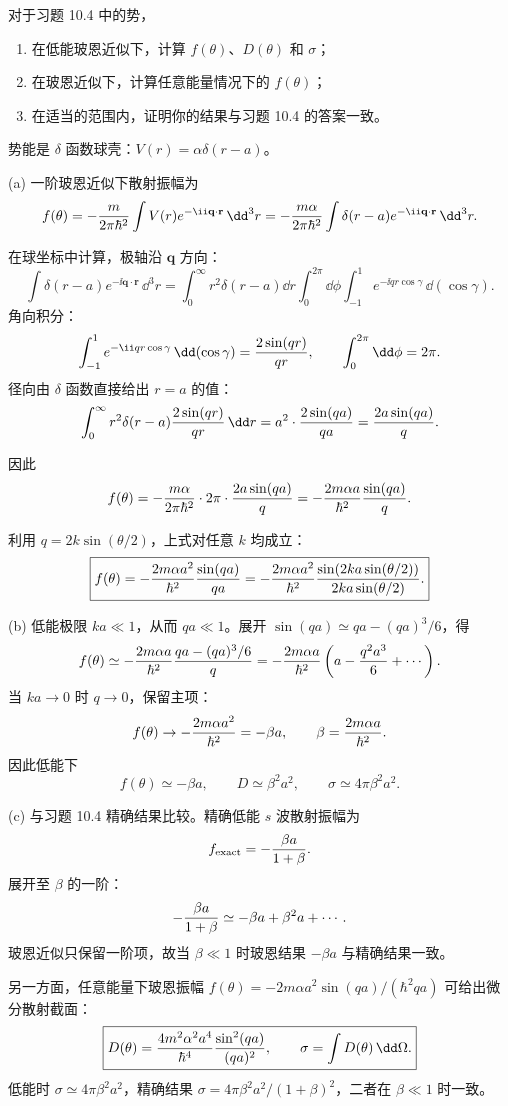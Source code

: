 \begin{question}
对于习题 10.4 中的势，
\begin{enumerate}
\item 在低能玻恩近似下，计算 $f(\theta)$、$D(\theta)$ 和 $\sigma$；
\item 在玻恩近似下，计算任意能量情况下的 $f(\theta)$；
\item 在适当的范围内，证明你的结果与习题 10.4 的答案一致。
\end{enumerate}
\end{question}
\begin{solution}
势能是 $\delta$ 函数球壳：$V(r)=\alpha\delta(r-a)$。

(a) 一阶玻恩近似下散射振幅为
\[
f(\theta)=-{m\over2\pi\hbar^2}\int V(r)e^{-\ii\mathbf q\cdot\mathbf r}\,\dd^3r
=-{m\alpha\over2\pi\hbar^2}\int \delta(r-a)e^{-\ii\mathbf q\cdot\mathbf r}\,\dd^3r.
\]

在球坐标中计算，极轴沿 $\mathbf q$ 方向：
\[
\int \delta(r-a)e^{-\ii\mathbf q\cdot\mathbf r}\,\dd^3r
=\int_0^\infty r^2\delta(r-a)\dd r\int_0^{2\pi}\dd\phi\int_{-1}^{1}e^{-\ii qr\cos\gamma}\,\dd(\cos\gamma).
\]
角向积分：
\[
\int_{-1}^{1}e^{-\ii qr\cos\gamma}\,\dd(\cos\gamma)={2\sin(qr)\over qr},
\qquad\int_0^{2\pi}\dd\phi=2\pi.
\]
径向由 $\delta$ 函数直接给出 $r=a$ 的值：
\[
\int_0^\infty r^2\delta(r-a){2\sin(qr)\over qr}\,\dd r
=a^2\cdot{2\sin(qa)\over qa}={2a\sin(qa)\over q}.
\]

因此
\[
f(\theta)=-{m\alpha\over2\pi\hbar^2}\cdot2\pi\cdot{2a\sin(qa)\over q}
=-{2m\alpha a\over\hbar^2}{\sin(qa)\over q}.
\]

利用 $q=2k\sin(\theta/2)$，上式对任意 $k$ 均成立：
\[
\boxed{f(\theta)=-{2m\alpha a^2\over\hbar^2}{\sin(qa)\over qa}
=-{2m\alpha a^2\over\hbar^2}{\sin(2ka\sin(\theta/2))\over 2ka\sin(\theta/2)}.}
\]

(b) 低能极限 $ka\ll1$，从而 $qa\ll1$。展开 $\sin(qa)\simeq qa-(qa)^3/6$，得
\[
f(\theta)\simeq-{2m\alpha a\over\hbar^2}{qa-(qa)^3/6\over q}
=-{2m\alpha a\over\hbar^2}\left(a-{q^2a^3\over6}+\cdots\right).
\]
当 $ka\to0$ 时 $q\to0$，保留主项：
\[
f(\theta)\to-{2m\alpha a^2\over\hbar^2}=-\beta a,
\qquad\beta={2m\alpha a\over\hbar^2}.
\]
因此低能下
\[
\boxed{f(\theta)\simeq -\beta a,\qquad
D\simeq \beta^2a^2,\qquad
\sigma\simeq 4\pi\beta^2a^2.}
\]

(c) 与习题 10.4 精确结果比较。精确低能 $s$ 波散射振幅为
\[
f_{\text{exact}}=-{\beta a\over1+\beta}.
\]
展开至 $\beta$ 的一阶：
\[
-{\beta a\over1+\beta}\simeq-\beta a+\beta^2a+\cdots.
\]
玻恩近似只保留一阶项，故当 $\beta\ll1$ 时玻恩结果 $-\beta a$ 与精确结果一致。

另一方面，任意能量下玻恩振幅 $f(\theta)=-2m\alpha a^2\sin(qa)/(\hbar^2qa)$ 可给出微分散射截面：
\[
\boxed{D(\theta)={4m^2\alpha^2a^4\over\hbar^4}{\sin^2(qa)\over(qa)^2},
\qquad
\sigma=\int D(\theta)\,\dd\Omega.}
\]
低能时 $\sigma\simeq 4\pi\beta^2a^2$，精确结果 $\sigma=4\pi\beta^2a^2/(1+\beta)^2$，二者在 $\beta\ll1$ 时一致。
\end{solution}


